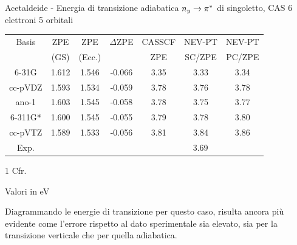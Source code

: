 \begin{center}
\begin{threeparttable}
\caption{\small Acetaldeide - Energia di transizione adiabatica $n_y \rightarrow \pi^{*}$ di singoletto, CAS 6 elettroni 5 orbitali}
\label{tab:acetaldeide_adiab_basis_5}
\small
\begin{tabular}{|c|ccc|ccc|}
\hline
Basis	& ZPE 			& ZPE 			& $\Delta$ZPE		& CASSCF	& NEV-PT			& NEV-PT  \\
		& 	(GS)		&  (Ecc.) 		& 					& ZPE		& SC/ZPE			& PC/ZPE  \\
\hline
6-31G	& 1.612			& 1.546			& -0.066			& 3.35			& 3.33			& 3.34 \\
cc-pVDZ & 1.593			& 1.534			& -0.059			& 3.78 			& 3.76			& 3.78 \\
ano-1	& 1.603			& 1.545			& -0.058			& 3.78			& 3.75 			& 3.77 \\
6-311G* & 1.600			& 1.545			& -0.055			& 3.79			& 3.78			& 3.80 \\
cc-pVTZ & 1.589			& 1.533			& -0.056			& 3.81			& 3.84			& 3.86 \\
\hline
\hline
Exp.\tnote{1}&				& 				& 					& \multicolumn{3}{c|}{3.69} \\
\hline
\end{tabular}
\begin{tablenotes}
 \item[1] Cfr. \cite{jpc-97-17-1993-4293}
 \item[ ] Valori in eV
\end{tablenotes}
\end{threeparttable}
\end{center}

Diagrammando le energie di transizione per questo caso, risulta ancora pi\`u
evidente come l'errore rispetto al dato sperimentale sia elevato, sia per la
transizione verticale che per quella adiabatica.

